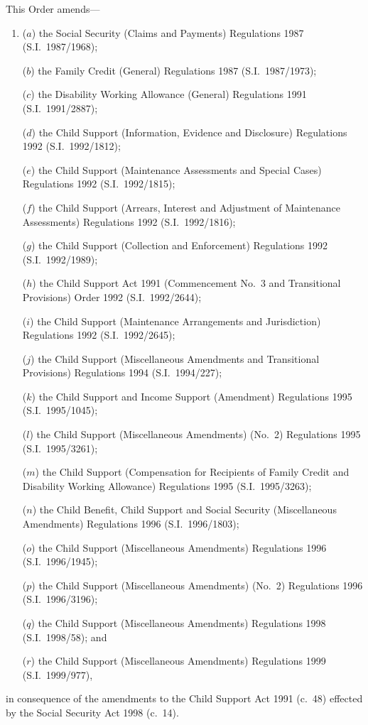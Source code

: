 \documentclass[12pt,a4paper]{article}
\begin{document}
This Order amends—
\begin{enumerate}\item[]
($a$) the Social Security (Claims and Payments) Regulations 1987 (S.I.\ 1987/\hspace{0pt}1968);

($b$) the Family Credit (General) Regulations 1987 (S.I.\ 1987/1973);

($c$) the Disability Working Allowance (General) Regulations 1991 (S.I.\ 1991/\hspace{0pt}2887);

($d$) the Child Support (Information, Evidence and Disclosure) Regulations 1992 (S.I.\ 1992/1812);

($e$) the Child Support (Maintenance Assessments and Special Cases) Regulations 1992 (S.I.\ 1992/1815);

($f$) the Child Support (Arrears, Interest and Adjustment of Maintenance Assessments) Regulations 1992 (S.I.\ 1992/1816);

($g$) the Child Support (Collection and Enforcement) Regulations 1992 (S.I.\ 1992/1989);

($h$) the Child Support Act 1991 (Commencement No.\ 3 and Transitional Provisions) Order 1992 (S.I.\ 1992/2644);

($i$) the Child Support (Maintenance Arrangements and Jurisdiction) Regulations 1992 (S.I.\ 1992/2645);

($j$) the Child Support (Miscellaneous Amendments and Transitional Provisions) Regulations 1994 (S.I.\ 1994/227);

($k$) the Child Support and Income Support (Amendment) Regulations 1995 (S.I.\ 1995/1045);

($l$) the Child Support (Miscellaneous Amendments) (No.\ 2) Regulations 1995 (S.I.\ 1995/3261);

($m$) the Child Support (Compensation for Recipients of Family Credit and Disability Working Allowance) Regulations 1995 (S.I.\ 1995/3263);

($n$) the Child Benefit, Child Support and Social Security (Miscellaneous Amendments) Regulations 1996 (S.I.\ 1996/1803);

($o$) the Child Support (Miscellaneous Amendments) Regulations 1996 (S.I.\ 1996/1945);

($p$) the Child Support (Miscellaneous Amendments) (No.\ 2) Regulations 1996 (S.I.\ 1996/3196);

($q$) the Child Support (Miscellaneous Amendments) Regulations 1998 (S.I.\ 1998/58); and

($r$) the Child Support (Miscellaneous Amendments) Regulations 1999 (S.I.\ 1999/977),
\end{enumerate}
in consequence of the amendments to the Child Support Act 1991 (c.\ 48) effected by the Social Security Act 1998 (c.\ 14).
\end{document}
